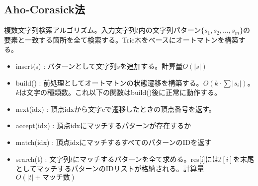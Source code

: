 \subsection{Aho-Corasick法}

複数文字列検索アルゴリズム。入力文字列$t$内の文字列パターン$\{s_1, s_2, \ldots, s_m \}$の要素と一致する箇所を全て検索する。Trie木をベースにオートマトンを構築する。

\begin{itemize}
    \item insert(s) : パターンとして文字列$s$を追加する。計算量$O(|s|)$
    \item build() : 前処理としてオートマトンの状態遷移を構築する。$O(k\cdot\sum{|s_i|})$。 $k$は文字の種類数。これ以下の関数はbuild()後に正常に動作する。
    \item next(idx) : 頂点idxから文字cで遷移したときの頂点番号を返す。
    \item accept(idx) : 頂点idxにマッチするパターンが存在するか
    \item match(idx) :  頂点idxにマッチするすべてのパターンのIDを返す
    \item search(t) : 文字列$t$にマッチするパターンを全て求める。{\ttfamily res[i]}には$t[i]$を末尾としてマッチするパターンのIDリストが格納される。計算量$O(|t|+マッチ数)$
\end{itemize}


